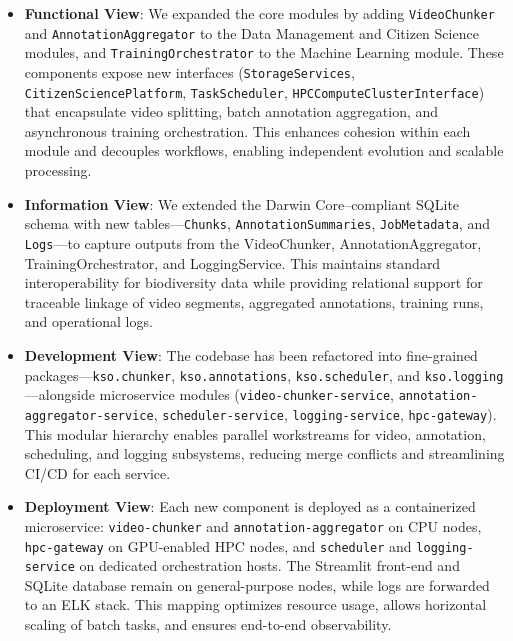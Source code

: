 \begin{itemize}
  \item \textbf{Functional View}: We expanded the core modules by adding \texttt{VideoChunker} and \texttt{AnnotationAggregator} to the Data Management and Citizen Science modules, and \texttt{TrainingOrchestrator} to the Machine Learning module. These components expose new interfaces (\texttt{StorageServices}, \texttt{CitizenSciencePlatform}, \texttt{TaskScheduler}, \texttt{HPCComputeClusterInterface}) that encapsulate video splitting, batch annotation aggregation, and asynchronous training orchestration. This enhances cohesion within each module and decouples workflows, enabling independent evolution and scalable processing.
  \item \textbf{Information View}: We extended the Darwin Core–compliant SQLite schema with new tables—\texttt{Chunks}, \texttt{AnnotationSummaries}, \texttt{JobMetadata}, and \texttt{Logs}—to capture outputs from the VideoChunker, AnnotationAggregator, TrainingOrchestrator, and LoggingService. This maintains standard interoperability for biodiversity data while providing relational support for traceable linkage of video segments, aggregated annotations, training runs, and operational logs.
  \item \textbf{Development View}: The codebase has been refactored into fine-grained packages—\texttt{kso.chunker}, \texttt{kso.annotations}, \texttt{kso.scheduler}, and \texttt{kso.logging}—alongside microservice modules (\texttt{video-chunker-service}, \texttt{annotation-aggregator-service}, \texttt{scheduler-service}, \texttt{logging-service}, \texttt{hpc-gateway}). This modular hierarchy enables parallel workstreams for video, annotation, scheduling, and logging subsystems, reducing merge conflicts and streamlining CI/CD for each service.
  \item \textbf{Deployment View}: Each new component is deployed as a containerized microservice: \texttt{video-chunker} and \texttt{annotation-aggregator} on CPU nodes, \texttt{hpc-gateway} on GPU-enabled HPC nodes, and \texttt{scheduler} and \texttt{logging-service} on dedicated orchestration hosts. The Streamlit front-end and SQLite database remain on general-purpose nodes, while logs are forwarded to an ELK stack. This mapping optimizes resource usage, allows horizontal scaling of batch tasks, and ensures end-to-end observability.
\end{itemize}